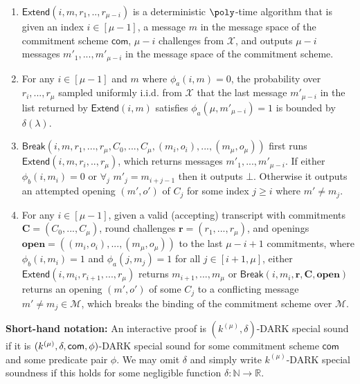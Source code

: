 \begin{definition}
\begin{enumerate}
\item  $\textsf{Extend}(i, m, r_1,..,r_{\mu-i})$ is a deterministic $\poly$-time algorithm that is given an index $i \in [\mu-1]$, a message $m$ in the message space of the commitment scheme $\textsf{com}$, $\mu-i$ challenges from $\mathcal{X}$, and outputs $\mu-i$ messages $m'_1,...,m'_{\mu-i}$ in the message space of the commitment scheme. 
\item For any $i \in [\mu-1]$ and $m$ where $\phi_a(i,m) = 0$, the probability over $r_i,...,r_\mu$ sampled uniformly i.i.d. from $\mathcal{X}$ that the last message $m'_{\mu-i}$ in the list returned by $\textsf{Extend}(i, m)$ satisfies $\phi_a(\mu, m'_{\mu-i}) = 1$ is bounded by $\delta(\lambda)$.   

\item $\textsf{Break}(i, m, r_1,...,r_\mu, C_0,...,C_\mu, (m_i, o_i),...,(m_{\mu}, o_{\mu}))$ first runs $\textsf{Extend}(i, m, r_i,..,r_{\mu})$, which returns messages $m'_1,...,m'_{\mu-i}$. If  either $\phi_b(i, m_i) = 0$ or $\forall_j$ $m'_j = m_{i + j -1}$ then it outputs $\bot$. Otherwise it outputs an attempted opening $(m', o')$ of $C_j$ for some index $j \geq i$ where $m' \neq m_j$. %



\item For any $i \in [\mu-1]$, given a valid (accepting) transcript with commitments $\mathbf{C} = (C_0,...,C_\mu)$, round challenges $\mathbf{r} = (r_1,...,r_{\mu})$, and openings $\mathbf{open} = ((m_{i},o_{i}),...,(m_\mu, o_\mu))$ to the last $\mu-i+1$ commitments, where $\phi_b(i, m_i) = 1$ and $\phi_a(j, m_j) = 1$ for all $j \in [i+1,\mu]$, either $\textsf{Extend}(i, m_i, r_{i+1},...,r_\mu)$ returns $m_{i+1},...,m_{\mu}$ or $\textsf{Break}(i, m_i, \mathbf{r}, \mathbf{C}, \mathbf{open})$ returns an opening $(m', o')$ of some $C_j$ to a conflicting message $m' \neq m_j \in \mathcal{M}$, which breaks the binding of the commitment scheme over $\mathcal{M}$.
\end{enumerate} 

\textbf{Short-hand notation:} An interactive proof is $(k^{(\mu)}, \delta)$-DARK special sound if it is $(k^{(\mu)}, \delta, \mathsf{com}, \phi)$-DARK special sound for some commitment scheme $\textsf{com}$ and some predicate pair $\phi$. We may omit $\delta$ and simply write $k^{(\mu)}$-DARK special soundness if this holds for some negligible function $\delta: \mathbb{N} \rightarrow \mathbb{R}$. 
\end{definition} 

